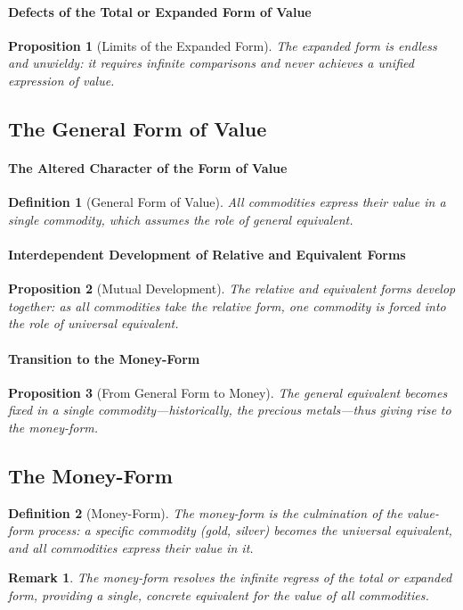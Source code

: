 \documentclass{article}
\newtheorem{innerdef}{Definition}
\newtheorem{innerprop}{Proposition}
\newtheorem{innerremark}{Remark}
\newenvironment{definition}{\begin{innerdef}}{\end{innerdef}}
\newenvironment{proposition}{\begin{innerprop}}{\end{innerprop}}
\newenvironment{remark}{\begin{innerremark}}{\end{innerremark}}
\begin{document}
\paragraph{Defects of the Total or Expanded Form of Value} %

\begin{proposition}[Limits of the Expanded Form]
The expanded form is endless and unwieldy: 
it requires infinite comparisons and never achieves a unified expression of value.
\end{proposition}

\subsection{The General Form of Value} %

\paragraph{The Altered Character of the Form of Value} %

\begin{definition}[General Form of Value]
All commodities express their value in a single commodity, which assumes the role of general equivalent.
\end{definition}

\paragraph{Interdependent Development of Relative and Equivalent Forms} %

\begin{proposition}[Mutual Development]
The relative and equivalent forms develop together: 
as all commodities take the relative form, one commodity is forced into the role of universal equivalent.
\end{proposition}

\paragraph{Transition to the Money-Form} %

\begin{proposition}[From General Form to Money]
The general equivalent becomes fixed in a single commodity—historically, the precious metals—thus giving rise to the money-form.
\end{proposition}

\subsection{The Money-Form} %

\begin{definition}[Money-Form]
The money-form is the culmination of the value-form process: 
a specific commodity (gold, silver) becomes the universal equivalent, 
and all commodities express their value in it.
\end{definition}

\begin{remark}
The money-form resolves the infinite regress of the total or expanded form, 
providing a single, concrete equivalent for the value of all commodities.
\end{remark}
\end{document}
